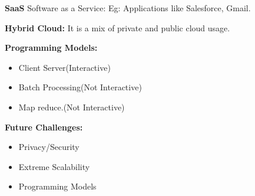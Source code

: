 \documentclass[twoside]{article}
\begin{document}
\textbf{SaaS} Software as a Service: Eg: Applications like Salesforce, Gmail.

\textbf{Hybrid Cloud:} It is a mix of private and public cloud usage.

\textbf{Programming Models:}
 \begin{itemize}
  \item Client Server(Interactive)
  \item Batch Processing(Not Interactive)
  \item Map reduce.(Not Interactive)
\end{itemize}

\textbf{Future Challenges:}
 \begin{itemize}
  \item Privacy/Security
  \item Extreme Scalability
  \item Programming Models
\end{itemize}
\end{document}
